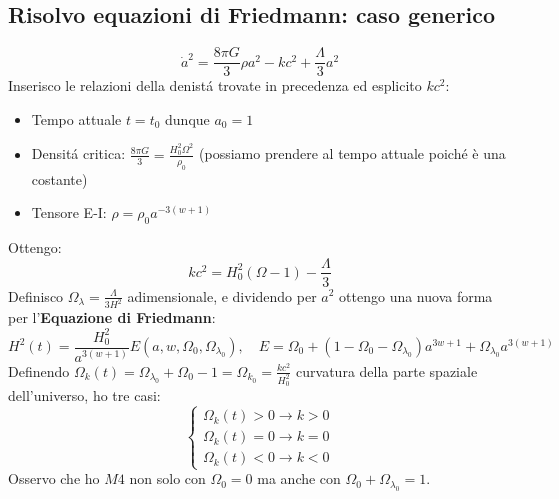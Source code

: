 \documentclass[12pt, a4paper]{article}
\begin{document}
\subsection{Risolvo equazioni di Friedmann: caso generico}
\begin{equation}
    \dot{a}^2 = \frac{8 \pi G}{3} \rho a^2 - kc^2 + \frac{\Lambda}{3} a^2
\end{equation}
Inserisco le relazioni della denist\'{a} trovate in precedenza ed esplicito $kc^2$:
\begin{itemize}
    \item Tempo attuale $t=t_0$ dunque $a_0=1$
    \item Densit\'{a} critica: $\frac{8 \pi G}{3}=\frac{H_0^2 \Omega^2}{\rho_0}$ (possiamo prendere al tempo attuale poich\'{e} è una costante)
    \item Tensore E-I: $\rho=\rho_0 a^{-3(w+1)}$
\end{itemize}
Ottengo:
\begin{equation}
    kc^2=H_0^2(\Omega - 1)-\frac{\Lambda}{3}
\end{equation}
Definisco $\Omega_{\lambda}=\frac{\Lambda}{3 H^2}$ adimensionale, e dividendo per $a^2$ ottengo una nuova forma per l'\textbf{Equazione di Friedmann}:
\begin{equation}
    H^2(t)=\frac{H_0^2}{a^{3(w+1)}}E(a,w,\Omega_0, \Omega_{\lambda_0}), \quad E=\Omega_0+(1-\Omega_0-\Omega_{\lambda_0})a^{3w+1}+\Omega_{\lambda_0}a^{3(w+1)}
\end{equation}
Definendo $\Omega_k(t)=\Omega_{\lambda_0} + \Omega_0 -1=\Omega_{k_0}=\frac{kc^2}{H_0^2}$ curvatura della parte spaziale dell'universo, ho tre casi:
\begin{equation}
  \begin{cases}
         \Omega_k(t)>0 \rightarrow k>0
         \\
         \Omega_k(t)=0 \rightarrow k=0
         \\
         \Omega_k(t)<0 \rightarrow k<0
    \end{cases}
\end{equation}
Osservo che ho $M4$ non solo con $\Omega_0=0$ ma anche con $\Omega_0+\Omega_{\lambda_0}=1$.
\end{document}

